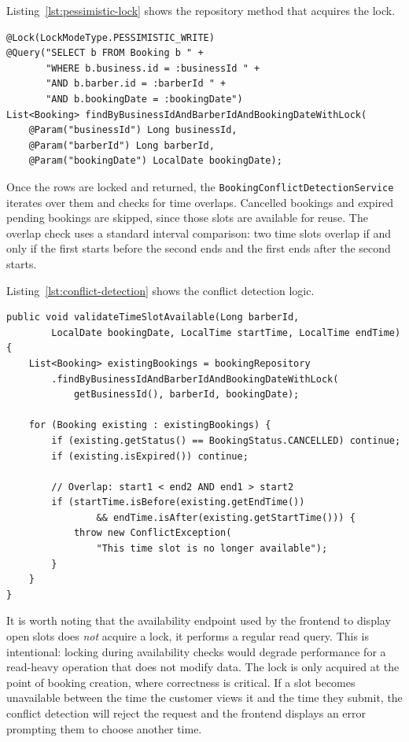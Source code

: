 Listing~\ref{lst:pessimistic-lock} shows the repository method that acquires the lock.

\begin{lstlisting}[caption={Pessimistic write lock on booking rows for conflict detection.}, label={lst:pessimistic-lock}]
@Lock(LockModeType.PESSIMISTIC_WRITE)
@Query("SELECT b FROM Booking b " +
       "WHERE b.business.id = :businessId " +
       "AND b.barber.id = :barberId " +
       "AND b.bookingDate = :bookingDate")
List<Booking> findByBusinessIdAndBarberIdAndBookingDateWithLock(
    @Param("businessId") Long businessId,
    @Param("barberId") Long barberId,
    @Param("bookingDate") LocalDate bookingDate);
\end{lstlisting}

Once the rows are locked and returned, the \texttt{BookingConflictDetectionService} iterates over them and checks for time overlaps. Cancelled bookings and expired pending bookings are skipped, since those slots are available for reuse. The overlap check uses a standard interval comparison: two time slots overlap if and only if the first starts before the second ends and the first ends after the second starts.

Listing~\ref{lst:conflict-detection} shows the conflict detection logic.

\begin{lstlisting}[caption={Time slot conflict detection with pessimistic locking.}, label={lst:conflict-detection}]
public void validateTimeSlotAvailable(Long barberId,
        LocalDate bookingDate, LocalTime startTime, LocalTime endTime) {
    List<Booking> existingBookings = bookingRepository
        .findByBusinessIdAndBarberIdAndBookingDateWithLock(
            getBusinessId(), barberId, bookingDate);

    for (Booking existing : existingBookings) {
        if (existing.getStatus() == BookingStatus.CANCELLED) continue;
        if (existing.isExpired()) continue;

        // Overlap: start1 < end2 AND end1 > start2
        if (startTime.isBefore(existing.getEndTime())
                && endTime.isAfter(existing.getStartTime())) {
            throw new ConflictException(
                "This time slot is no longer available");
        }
    }
}
\end{lstlisting}

It is worth noting that the availability endpoint used by the frontend to display open slots does \textit{not} acquire a lock, it performs a regular read query. This is intentional: locking during availability checks would degrade performance for a read-heavy operation that does not modify data. The lock is only acquired at the point of booking creation, where correctness is critical. If a slot becomes unavailable between the time the customer views it and the time they submit, the conflict detection will reject the request and the frontend displays an error prompting them to choose another time.


